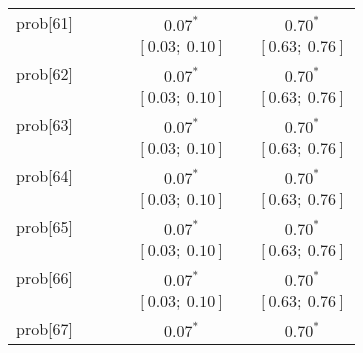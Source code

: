 \begin{table}
\begin{center}
\begin{tabular}{l c c c c c c }
prob[61]  &                           &                           &                           & $0.07^{*}$              &                           & $0.70^{*}$            \\
          &                           &                           &                           & $[0.03;\ 0.10]$         &                           & $[0.63;\ 0.76]$       \\
prob[62]  &                           &                           &                           & $0.07^{*}$              &                           & $0.70^{*}$            \\
          &                           &                           &                           & $[0.03;\ 0.10]$         &                           & $[0.63;\ 0.76]$       \\
prob[63]  &                           &                           &                           & $0.07^{*}$              &                           & $0.70^{*}$            \\
          &                           &                           &                           & $[0.03;\ 0.10]$         &                           & $[0.63;\ 0.76]$       \\
prob[64]  &                           &                           &                           & $0.07^{*}$              &                           & $0.70^{*}$            \\
          &                           &                           &                           & $[0.03;\ 0.10]$         &                           & $[0.63;\ 0.76]$       \\
prob[65]  &                           &                           &                           & $0.07^{*}$              &                           & $0.70^{*}$            \\
          &                           &                           &                           & $[0.03;\ 0.10]$         &                           & $[0.63;\ 0.76]$       \\
prob[66]  &                           &                           &                           & $0.07^{*}$              &                           & $0.70^{*}$            \\
          &                           &                           &                           & $[0.03;\ 0.10]$         &                           & $[0.63;\ 0.76]$       \\
prob[67]  &                           &                           &                           & $0.07^{*}$              &                           & $0.70^{*}$            \\

\end{tabular}
\end{center}
\end{table}
